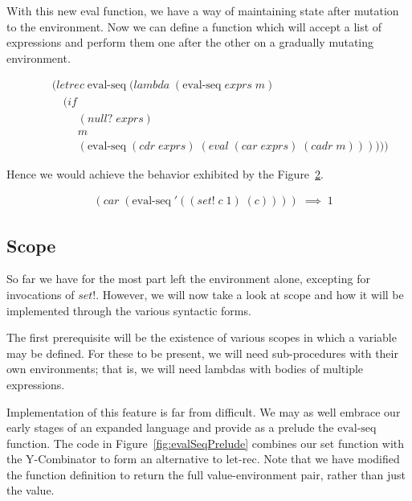 With this new eval function, we have a way of maintaining state after 
mutation to the environment. Now we can define a function which will accept
a list of expressions and perform them one after the other on a gradually
mutating environment.

\begin{figure}[htp]
\caption{}\label{fig:evalSeqDef}
\begin{align*}
& (letrec \; \text{eval-seq} \; (lambda \; (\text{eval-seq} \; exprs \; m)
\\& \quad (if
\\& \qquad \; (null? \; exprs)
\\& \qquad \; m
\\& \qquad \; (\text{eval-seq} \; (cdr \; exprs) \; (eval \; (car \; exprs) \; (cadr \; m))))))
\end{align*}
\end{figure}

Hence we would achieve the behavior exhibited by the
Figure~\ref{fig:evalSeqExample}. 

\begin{figure}[htp]
\caption{}\label{fig:evalSeqExample}
\begin{align*}
& (car \; (\text{eval-seq} \; '((set! \; c \; 1) \; (c)))) \; \implies \; 1
\end{align*}
\end{figure}

\subsection{Scope}
So far we have for the most part left the environment alone, excepting for
invocations of $set!$. However, we will now take a look at scope and how it
will be implemented through the various syntactic forms.

The first prerequisite will be the existence of various scopes in which a
variable may be defined. For these to be present, we will need sub-procedures
with their own environments; that is, we will need lambdas with bodies of
multiple expressions.

Implementation of this feature is far from difficult. We may as well embrace
our early stages of an expanded language and provide as a prelude the
$\text{eval-seq}$ function. The code in Figure~\ref{fig:evalSeqPrelude} combines our
set function with the Y-Combinator to form an alternative to $\text{let-rec}$. Note
that we have modified the function definition to return the full
value-environment pair, rather than just the value.

